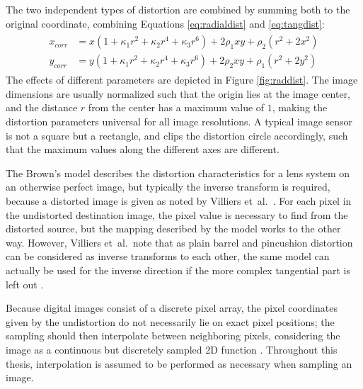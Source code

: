 The two independent types of distortion are combined by summing both to the original coordinate, combining Equations \ref{eq:radialdist} and \ref{eq:tangdist}:
\begin{align} \label{eq:bothdist} \begin{split}
	x_{corr} &= x (1 + \kappa_1 r^2 + \kappa_2 r^4 + \kappa_3 r^6) + 2 \rho_1 x y + \rho_2 (r^2 + 2 x^2)\\
	y_{corr} &= y (1 + \kappa_1 r^2 + \kappa_2 r^4 + \kappa_3 r^6) + 2 \rho_2 x y + \rho_1 (r^2 + 2 y^2)
\end{split} \end{align}
The effects of different parameters are depicted in Figure \ref{fig:raddist}.
The image dimensions are usually normalized such that the origin lies at the image center, and the distance $r$ from the center has a maximum value of $1$, making the distortion parameters universal for all image resolutions.
A typical image sensor is not a square but a rectangle, and clips the distortion circle accordingly, such that the maximum values along the different axes are different.


The Brown's model describes the distortion characteristics for a lens system on an otherwise perfect image, but typically the inverse transform is required, because a distorted image is given as noted by Villiers et~al.\ \cite{villiers2008centi}. %
For each pixel in the undistorted destination image, the pixel value is necessary to find from the distorted source, but the mapping described by the model works to the other way.
However, Villiers et~al.\ note that as plain barrel and pincushion distortion can be considered as inverse transforms to each other, the same model can actually be used for the inverse direction if the more complex tangential part is left out \cite{villiers2008centi}.

Because digital images consist of a discrete pixel array, the pixel coordinates given by the undistortion do not necessarily lie on exact pixel positions; the sampling should then interpolate between neighboring pixels, considering the image as a continuous but discretely sampled 2D function \cite{wolberg1990digital}.
Throughout this thesis, interpolation is assumed to be performed as necessary when sampling an image.

